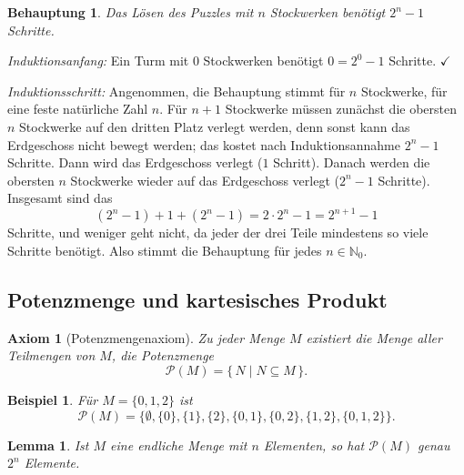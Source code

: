 \documentclass[a4paper]{article}
\makeatletter
\theoremstyle{kurzskript}
\newtheorem{lemma}[satz]{Lemma}
\newtheorem{axiom}{Axiom}                    %
\newtheorem*{bsp}{Beispiel}
\newtheorem*{beh}{Behauptung}
\renewenvironment{proof}[1][\proofname]{\par\pushQED{\qed}%
  \normalfont\topsep\medskipamount\relax
  \trivlist\item[\hskip\labelsep\bfseries #1\@addpunct{.}]\ignorespaces}%
  {\popQED\endtrivlist\@endpefalse}
\renewcommand{\proofname}{Beweis}
\newcommand{\N}{\mathbb{N}}
\newcommand{\Pot}{\mathcal{P}}
\makeatother
\begin{document}
\begin{beh}
Das Lösen des Puzzles mit $n$ Stockwerken benötigt $2^n - 1$ Schritte.
\end{beh}

\begin{proof}
\emph{Induktionsanfang:} Ein Turm mit $0$ Stockwerken benötigt $0 = 2^0 - 1$ Schritte. $\checkmark$

\emph{Induktionsschritt:} Angenommen, die Behauptung stimmt für $n$ Stockwerke, für eine feste natürliche Zahl $n$. Für $n + 1$ Stockwerke müssen zunächst die obersten $n$ Stockwerke auf den dritten Platz verlegt werden, denn sonst kann das Erdgeschoss nicht bewegt werden; das kostet nach Induktionsannahme $2^n - 1$ Schritte. Dann wird das Erdgeschoss verlegt ($1$ Schritt). Danach werden die obersten $n$ Stockwerke wieder auf das Erdgeschoss verlegt ($2^n - 1$ Schritte). Insgesamt sind das
\[
  (2^n - 1) + 1 + (2^n - 1) = 2 \cdot 2^n - 1 = 2^{n+1} - 1
\]
Schritte, und weniger geht nicht, da jeder der drei Teile mindestens so viele Schritte benötigt. Also stimmt die Behauptung für jedes $n \in \N_0$.
\end{proof}

\subsection{Potenzmenge und kartesisches Produkt}

\begin{axiom}[Potenzmengenaxiom]
Zu jeder Menge $M$ existiert die Menge aller Teilmengen von $M$, die \emph{Potenzmenge}
\[
  \Pot(M) = \{\, N \mid N \subseteq M \,\}.
\]
\end{axiom}

\begin{bsp}
Für $M = \{0, 1, 2\}$ ist
\[
  \Pot(M) = \bigl\{\emptyset, \{0\}, \{1\}, \{2\}, \{0, 1\}, \{0, 2\}, \{1, 2\}, \{0, 1, 2\}\bigr\}.
\]
\end{bsp}

\begin{lemma}
Ist $M$ eine endliche Menge mit $n$ Elementen, so hat $\Pot(M)$ genau $2^n$ Elemente.
\end{lemma}
\end{document}
